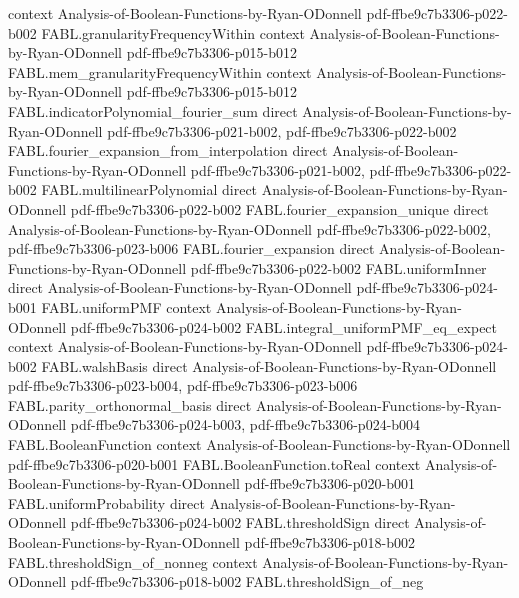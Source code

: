 \begin{theorem}
  {context}
  {Analysis-of-Boolean-Functions-by-Ryan-ODonnell}
  {pdf-ffbe9c7b3306-p022-b002}
\proofstep
  {FABL.granularityFrequencyWithin}
  {context}
  {Analysis-of-Boolean-Functions-by-Ryan-ODonnell}
  {pdf-ffbe9c7b3306-p015-b012}
\proofstep
  {FABL.mem_granularityFrequencyWithin}
  {context}
  {Analysis-of-Boolean-Functions-by-Ryan-ODonnell}
  {pdf-ffbe9c7b3306-p015-b012}
\proofstep
  {FABL.indicatorPolynomial_fourier_sum}
  {direct}
  {Analysis-of-Boolean-Functions-by-Ryan-ODonnell}
  {pdf-ffbe9c7b3306-p021-b002,
    pdf-ffbe9c7b3306-p022-b002}
\proofstep
  {FABL.fourier_expansion_from_interpolation}
  {direct}
  {Analysis-of-Boolean-Functions-by-Ryan-ODonnell}
  {pdf-ffbe9c7b3306-p021-b002,
    pdf-ffbe9c7b3306-p022-b002}
\proofstep
  {FABL.multilinearPolynomial}
  {direct}
  {Analysis-of-Boolean-Functions-by-Ryan-ODonnell}
  {pdf-ffbe9c7b3306-p022-b002}
\proofstep
  {FABL.fourier_expansion_unique}
  {direct}
  {Analysis-of-Boolean-Functions-by-Ryan-ODonnell}
  {pdf-ffbe9c7b3306-p022-b002,
    pdf-ffbe9c7b3306-p023-b006}
\proofstep
  {FABL.fourier_expansion}
  {direct}
  {Analysis-of-Boolean-Functions-by-Ryan-ODonnell}
  {pdf-ffbe9c7b3306-p022-b002}
\proofstep
  {FABL.uniformInner}
  {direct}
  {Analysis-of-Boolean-Functions-by-Ryan-ODonnell}
  {pdf-ffbe9c7b3306-p024-b001}
\proofstep
  {FABL.uniformPMF}
  {context}
  {Analysis-of-Boolean-Functions-by-Ryan-ODonnell}
  {pdf-ffbe9c7b3306-p024-b002}
\proofstep
  {FABL.integral_uniformPMF_eq_expect}
  {context}
  {Analysis-of-Boolean-Functions-by-Ryan-ODonnell}
  {pdf-ffbe9c7b3306-p024-b002}
\proofstep
  {FABL.walshBasis}
  {direct}
  {Analysis-of-Boolean-Functions-by-Ryan-ODonnell}
  {pdf-ffbe9c7b3306-p023-b004,
    pdf-ffbe9c7b3306-p023-b006}
\proofstep
  {FABL.parity_orthonormal_basis}
  {direct}
  {Analysis-of-Boolean-Functions-by-Ryan-ODonnell}
  {pdf-ffbe9c7b3306-p024-b003,
    pdf-ffbe9c7b3306-p024-b004}
\proofstep
  {FABL.BooleanFunction}
  {context}
  {Analysis-of-Boolean-Functions-by-Ryan-ODonnell}
  {pdf-ffbe9c7b3306-p020-b001}
\proofstep
  {FABL.BooleanFunction.toReal}
  {context}
  {Analysis-of-Boolean-Functions-by-Ryan-ODonnell}
  {pdf-ffbe9c7b3306-p020-b001}
\proofstep
  {FABL.uniformProbability}
  {direct}
  {Analysis-of-Boolean-Functions-by-Ryan-ODonnell}
  {pdf-ffbe9c7b3306-p024-b002}
\proofstep
  {FABL.thresholdSign}
  {direct}
  {Analysis-of-Boolean-Functions-by-Ryan-ODonnell}
  {pdf-ffbe9c7b3306-p018-b002}
\proofstep
  {FABL.thresholdSign_of_nonneg}
  {context}
  {Analysis-of-Boolean-Functions-by-Ryan-ODonnell}
  {pdf-ffbe9c7b3306-p018-b002}
\proofstep
  {FABL.thresholdSign_of_neg}

\end{theorem}
